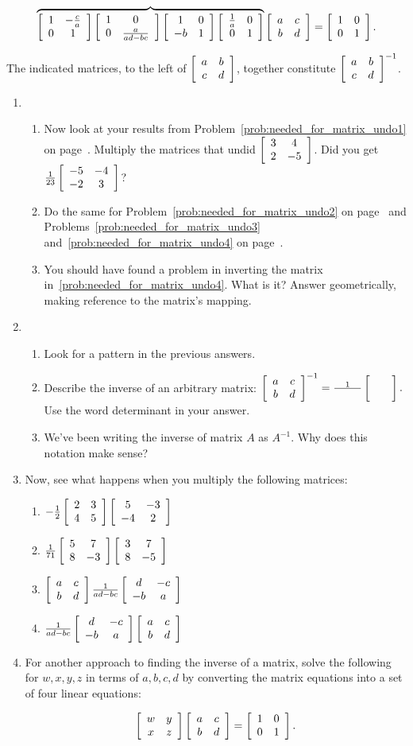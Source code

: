 \documentclass[../gatm.tex]{subfiles}
\begin{document}
$$\overbrace{\left[\begin{array}{cc} 1 & -\frac{c}{a} \\ 0 & 1 \end{array}\right]\left[\begin{array}{cc} 1 & 0 \\ 0 & \frac{a}{ad-bc} \end{array}\right]\left[\begin{array}{cc} 1 & 0 \\ -b & 1 \end{array}\right]\left[\begin{array}{cc} \frac{1}{a} & 0 \\ 0 & 1 \end{array}\right]}\left[\begin{array}{cc} a & c \\ b & d \end{array}\right]=\left[\begin{array}{cc} 1 & 0 \\ 0 & 1 \end{array}\right].$$

\noindent The indicated matrices, to the left of $\left[\begin{array}{cc} a & b \\ c & d \end{array}\right]$, together constitute $\left[\begin{array}{cc} a & b \\ c & d \end{array}\right]^{-1}$.

\begin{enumerate}
\setcounter{enumi}{\value{problem_i}}
\item \begin{enumerate}
\item \label{prob:why_did_herreshoff_do_this1}Now look at your results from Problem~\ref{prob:needed_for_matrix_undo1} on page~\pageref{prob:needed_for_matrix_undo1}. Multiply the matrices that undid $\left[\begin{array}{cc} 3 & 4 \\ 2 & -5 \end{array}\right]$. Did you get $\frac{1}{23}\left[\begin{array}{cc} -5 & -4 \\ -2 & 3 \end{array}\right]$?
\item \label{prob:why_did_herreshoff_do_this2}Do the same for Problem~\ref{prob:needed_for_matrix_undo2} on page~\pageref{prob:needed_for_matrix_undo2} and Problems~\ref{prob:needed_for_matrix_undo3} and~\ref{prob:needed_for_matrix_undo4} on page~\pageref{prob:needed_for_matrix_undo3}.
\item You should have found a problem in inverting the matrix in~\ref{prob:needed_for_matrix_undo4}. What is it? Answer geometrically, making reference to the matrix's mapping.
\end{enumerate}
\item \begin{enumerate}
\item Look for a pattern in the previous answers.
\item Describe the inverse of an arbitrary matrix: $\left[\begin{array}{cc} a & c \\ b & d \end{array}\right]^{-1}=\frac{1}{\phantom{000000}}\left[\begin{array}{cc}  &  \\  &  \end{array}\right].$ Use the word determinant in your answer.
\item We've been writing the inverse of matrix $A$ as $A^{-1}$. Why does this notation make sense?
\end{enumerate}
\item Now, see what happens when you multiply the following matrices:
\begin{multicols}{2}
\begin{enumerate}
\item $-\frac{1}{2}\left[\begin{array}{cc} 2 & 3 \\ 4 & 5 \end{array}\right]\left[\begin{array}{cc} 5 & -3 \\ -4 & 2 \end{array}\right]$
\item $\frac{1}{71}\left[\begin{array}{cc} 5 & 7 \\ 8 & -3 \end{array}\right]\left[\begin{array}{cc} 3 & 7 \\ 8 & -5 \end{array}\right]$
\item $\left[\begin{array}{cc} a & c \\ b & d \end{array}\right]\frac{1}{ad-bc}\left[\begin{array}{cc} d & -c \\ -b & a \end{array}\right]$
\item $\frac{1}{ad-bc}\left[\begin{array}{cc} d & -c \\ -b & a \end{array}\right]\left[\begin{array}{cc} a & c \\ b & d \end{array}\right]$
\end{enumerate}
\end{multicols}
\item For another approach to finding the inverse of a matrix, solve the following for $w,x,y,z$ in terms of $a,b,c,d$ by converting the matrix equations into a set of four linear equations:

$$\left[\begin{array}{cc} w & y \\ x & z \end{array}\right]\left[\begin{array}{cc} a & c \\ b & d \end{array}\right]=\left[\begin{array}{cc} 1 & 0 \\ 0 & 1 \end{array}\right].$$
\setcounter{problem_i}{\value{enumi}}
\end{enumerate}
\end{document}
